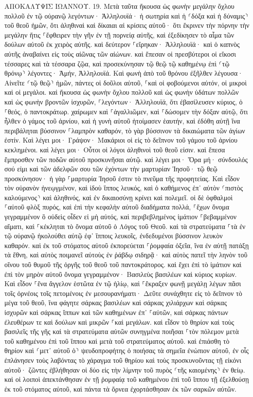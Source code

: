 \documentclass[twoside, 9pt]{extreport}
\begin{document}
ΑΠΟΚΑΛΥΨΙΣ ΙΩΑΝΝΟΥ.
19.
Μετὰ ταῦτα ἤκουσα ὡς φωνὴν μεγάλην ὄχλου πολλοῦ ἐν τῷ οὐρανῷ λεγόντων· Ἁλληλουϊά· ἡ σωτηρία καὶ ἡ ⸂δόξα καὶ ἡ δύναμις⸃ τοῦ θεοῦ ἡμῶν, 
ὅτι ἀληθιναὶ καὶ δίκαιαι αἱ κρίσεις αὐτοῦ· ὅτι ἔκρινεν τὴν πόρνην τὴν μεγάλην ἥτις ⸀ἔφθειρεν τὴν γῆν ἐν τῇ πορνείᾳ αὐτῆς, καὶ ἐξεδίκησεν τὸ αἷμα τῶν δούλων αὐτοῦ ἐκ χειρὸς αὐτῆς. 
καὶ δεύτερον ⸀εἴρηκαν· Ἁλληλουϊά· καὶ ὁ καπνὸς αὐτῆς ἀναβαίνει εἰς τοὺς αἰῶνας τῶν αἰώνων. 
καὶ ἔπεσαν οἱ πρεσβύτεροι οἱ εἴκοσι τέσσαρες καὶ τὰ τέσσαρα ζῷα, καὶ προσεκύνησαν τῷ θεῷ τῷ καθημένῳ ἐπὶ ⸂τῷ θρόνῳ⸃ λέγοντες· Ἀμήν, Ἁλληλουϊά. 
Καὶ φωνὴ ἀπὸ τοῦ θρόνου ἐξῆλθεν λέγουσα· Αἰνεῖτε ⸂τῷ θεῷ⸃ ἡμῶν, πάντες οἱ δοῦλοι αὐτοῦ, ⸀καὶ οἱ φοβούμενοι αὐτόν, οἱ μικροὶ καὶ οἱ μεγάλοι. 
καὶ ἤκουσα ὡς φωνὴν ὄχλου πολλοῦ καὶ ὡς φωνὴν ὑδάτων πολλῶν καὶ ὡς φωνὴν βροντῶν ἰσχυρῶν, ⸀λεγόντων· Ἁλληλουϊά, ὅτι ἐβασίλευσεν κύριος, ὁ ⸀θεός, ὁ παντοκράτωρ. 
χαίρωμεν καὶ ⸀ἀγαλλιῶμεν, καὶ ⸀δώσομεν τὴν δόξαν αὐτῷ, ὅτι ἦλθεν ὁ γάμος τοῦ ἀρνίου, καὶ ἡ γυνὴ αὐτοῦ ἡτοίμασεν ἑαυτήν, 
καὶ ἐδόθη αὐτῇ ἵνα περιβάληται βύσσινον ⸀λαμπρὸν καθαρόν, τὸ γὰρ βύσσινον τὰ δικαιώματα τῶν ἁγίων ἐστίν. 
Καὶ λέγει μοι· Γράψον· Μακάριοι οἱ εἰς τὸ δεῖπνον τοῦ γάμου τοῦ ἀρνίου κεκλημένοι. καὶ λέγει μοι· Οὗτοι οἱ λόγοι ἀληθινοὶ τοῦ θεοῦ εἰσιν. 
καὶ ἔπεσα ἔμπροσθεν τῶν ποδῶν αὐτοῦ προσκυνῆσαι αὐτῷ. καὶ λέγει μοι· Ὅρα μή· σύνδουλός σού εἰμι καὶ τῶν ἀδελφῶν σου τῶν ἐχόντων τὴν μαρτυρίαν Ἰησοῦ· τῷ θεῷ προσκύνησον· ἡ γὰρ ⸀μαρτυρία Ἰησοῦ ἐστιν τὸ πνεῦμα τῆς προφητείας. 
Καὶ εἶδον τὸν οὐρανὸν ἠνεῳγμένον, καὶ ἰδοὺ ἵππος λευκός, καὶ ὁ καθήμενος ἐπ᾽ αὐτὸν ⸂πιστὸς καλούμενος⸃ καὶ ἀληθινός, καὶ ἐν δικαιοσύνῃ κρίνει καὶ πολεμεῖ. 
οἱ δὲ ὀφθαλμοὶ ⸀αὐτοῦ φλὸξ πυρός, καὶ ἐπὶ τὴν κεφαλὴν αὐτοῦ διαδήματα πολλά, ⸀ἔχων ὄνομα γεγραμμένον ὃ οὐδεὶς οἶδεν εἰ μὴ αὐτός, 
καὶ περιβεβλημένος ἱμάτιον ⸀βεβαμμένον αἵματι, καὶ ⸀κέκληται τὸ ὄνομα αὐτοῦ ὁ Λόγος τοῦ Θεοῦ. 
καὶ τὰ στρατεύματα ⸀τὰ ἐν τῷ οὐρανῷ ἠκολούθει αὐτῷ ἐφ᾽ ἵπποις λευκοῖς, ἐνδεδυμένοι βύσσινον λευκὸν καθαρόν. 
καὶ ἐκ τοῦ στόματος αὐτοῦ ἐκπορεύεται ⸀ῥομφαία ὀξεῖα, ἵνα ἐν αὐτῇ πατάξῃ τὰ ἔθνη, καὶ αὐτὸς ποιμανεῖ αὐτοὺς ἐν ῥάβδῳ σιδηρᾷ· καὶ αὐτὸς πατεῖ τὴν ληνὸν τοῦ οἴνου τοῦ θυμοῦ τῆς ὀργῆς τοῦ θεοῦ τοῦ παντοκράτορος. 
καὶ ἔχει ἐπὶ τὸ ἱμάτιον καὶ ἐπὶ τὸν μηρὸν αὐτοῦ ὄνομα γεγραμμένον· Βασιλεὺς βασιλέων καὶ κύριος κυρίων. 
Καὶ εἶδον ⸀ἕνα ἄγγελον ἑστῶτα ἐν τῷ ἡλίῳ, καὶ ⸀ἔκραξεν φωνῇ μεγάλῃ λέγων πᾶσι τοῖς ὀρνέοις τοῖς πετομένοις ἐν μεσουρανήματι· Δεῦτε συνάχθητε εἰς τὸ δεῖπνον τὸ μέγα τοῦ θεοῦ, 
ἵνα φάγητε σάρκας βασιλέων καὶ σάρκας χιλιάρχων καὶ σάρκας ἰσχυρῶν καὶ σάρκας ἵππων καὶ τῶν καθημένων ἐπ᾽ ⸀αὐτῶν, καὶ σάρκας πάντων ἐλευθέρων τε καὶ δούλων καὶ μικρῶν ⸀καὶ μεγάλων. 
καὶ εἶδον τὸ θηρίον καὶ τοὺς βασιλεῖς τῆς γῆς καὶ τὰ στρατεύματα αὐτῶν συνηγμένα ποιῆσαι ⸀τὸν πόλεμον μετὰ τοῦ καθημένου ἐπὶ τοῦ ἵππου καὶ μετὰ τοῦ στρατεύματος αὐτοῦ. 
καὶ ἐπιάσθη τὸ θηρίον καὶ ⸂μετ᾽ αὐτοῦ ὁ⸃ ψευδοπροφήτης ὁ ποιήσας τὰ σημεῖα ἐνώπιον αὐτοῦ, ἐν οἷς ἐπλάνησεν τοὺς λαβόντας τὸ χάραγμα τοῦ θηρίου καὶ τοὺς προσκυνοῦντας τῇ εἰκόνι αὐτοῦ· ζῶντες ἐβλήθησαν οἱ δύο εἰς τὴν λίμνην τοῦ πυρὸς ⸂τῆς καιομένης⸃ ἐν θείῳ. 
καὶ οἱ λοιποὶ ἀπεκτάνθησαν ἐν τῇ ῥομφαίᾳ τοῦ καθημένου ἐπὶ τοῦ ἵππου τῇ ἐξελθούσῃ ἐκ τοῦ στόματος αὐτοῦ, καὶ πάντα τὰ ὄρνεα ἐχορτάσθησαν ἐκ τῶν σαρκῶν αὐτῶν. 
\end{document}
